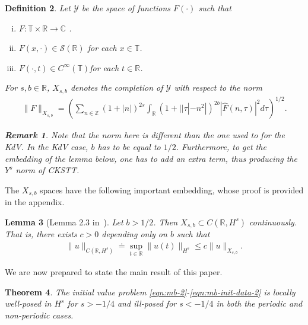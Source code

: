 \documentclass[12pt,reqno]{amsart}
\numberwithin{equation}{section}  %
\newcommand{\rr}{\mathbb{R}}
\newcommand{\zz}{\mathbb{Z}}
\newcommand{\cc}{\mathbb{C}}
\newcommand{\ci}{\mathbb{T}}
\newcommand{\wh}{\widehat}
\newtheorem{theorem}{Theorem}[section]
\newtheorem{lemma}[theorem]{Lemma}
\newtheorem{definition}[theorem]{Definition}
\newtheorem{remark}[theorem]{Remark}
\begin{document}
\begin{definition}
  Let $\mathcal{Y}$ be the space of functions $F(\cdot)$ such that
  \begin{enumerate}[(i)]
   \item{$F: \ci \times \rr \to \cc$ }.
   \item{ $F(x, \cdot) \in \mathcal{S}(\rr)$ for each $x \in \ci$}.
   \item{ $F(\cdot, t) \in C^{\infty}(\ci)$for each $t \in \rr$}.
  \end{enumerate}
  For $s, b \in \rr$, $X_{s,b}$ denotes the completion of $\mathcal{Y}$ with
  respect to the norm
  \begin{equation}
  \begin{split}
    \|F\|_{X_{s,b}} = \left( \sum_{n \in \zz} (1 + |n|)^{2s} \int_{\rr}
    (1 + | | \tau | - n^{2} |)^{2b} |\wh{F}(n, \tau)|^{2} d \tau\right)^{1/2}.
  \end{split}
  \label{eqn:bous-norm}
  \end{equation}
  \begin{framed}
    \begin{remark}
    Note that the norm here is different than the one used to for the KdV. In
    the KdV case, $b$ has to be equal to $1/2$. Furthermore, to get the embedding
    of the lemma below, one has to add an extra term, thus producing the
    $Y^{s}$ norm of CKSTT.
    \label{rem:alternate-space}
    \end{remark}
  \end{framed}
\end{definition}
%
The $X_{s,b}$ spaces have the following important embedding, whose proof is
provided in the appendix.
%
%
%
%
%
%
%
%
\begin{lemma}[Lemma 2.3 in~\cite{Farah:2009uq}]
  Let $b > 1/2$. Then $X_{s, b} \subset C(\rr, H^s)$ continuously. That is,
  there exists $c>0$ depending only on $b$ such that
%
%
\begin{equation*}
\begin{split}
  \| u \|_{C(\rr, H^s) } \doteq \sup_{t \in \rr} \| u(t) \|_{H^s } 
  \le c \| u \|_{X_{s,b}}.
\end{split}
\end{equation*}
%
\label{lem:embedding}
\end{lemma}
%
%
We are now prepared to state the main result of this paper.
%
%
%
%
%
%
%
%
%
%
\begin{theorem}
\label{thm:main}
The initial value problem 
\eqref{eqn:mb-2}-\eqref{eqn:mb-init-data-2} is locally well-posed in $H^s$ for
$s >
-1/4$ and ill-posed for $s < -1/4$ in both the periodic and non-periodic cases.
%
%
\end{theorem} 
%
%
%
%
%
%
%
%
%
%
\end{document}
